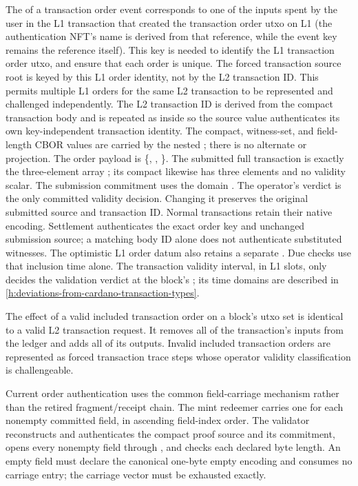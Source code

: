 \documentclass[../midgard.tex]{subfiles}
\begin{document}
The  of a transaction order event corresponds to one of the inputs spent by the user in the L1 transaction that created the transaction order utxo on L1 (the authentication NFT's name is derived from that reference, while the event key remains the reference itself).
This key is needed to identify the L1 transaction order utxo, and ensure that each order is unique.
The forced transaction source root is keyed by this L1 order identity, not by the L2 transaction ID.
This permits multiple L1 orders for the same L2 transaction to be represented and challenged independently.
The L2 transaction ID is derived from the compact transaction body and is
repeated as  inside  so the source value
authenticates its own key-independent transaction identity.  The compact,
witness-set, and field-length CBOR values are carried by the nested
; there is no alternate  or
 projection.
The order payload is \{, , \}.
The submitted full transaction is exactly the three-element array
; its compact likewise has three elements and
no validity scalar. The submission commitment uses the domain
. The operator's verdict is the only
committed validity decision. Changing it preserves the original submitted
source and transaction ID. Normal transactions retain their native encoding.
Settlement authenticates the exact order key and unchanged submission source;
a matching body ID alone does not authenticate substituted witnesses.
The optimistic L1 order datum also retains a separate .
Due checks use that inclusion time alone. The transaction validity interval, in L1 slots, only decides the validation verdict at the block's ; its time domains are described in \cref{h:deviations-from-cardano-transaction-types}.

The effect of a valid included transaction order on a block's utxo set is identical to a valid L2 transaction request.
It removes all of the transaction's inputs from the ledger and adds all of its outputs.
Invalid included transaction orders are represented as forced transaction trace steps whose operator validity classification is challengeable.

Current order authentication uses the common field-carriage mechanism rather than the retired fragment/receipt chain.
The mint redeemer carries one  for each nonempty committed field, in ascending field-index order.
The validator reconstructs and authenticates the compact proof source and its commitment, opens every nonempty field through , and checks each declared byte length.
An empty field must declare the canonical one-byte empty encoding and consumes no carriage entry; the carriage vector must be exhausted exactly.
\end{document}
